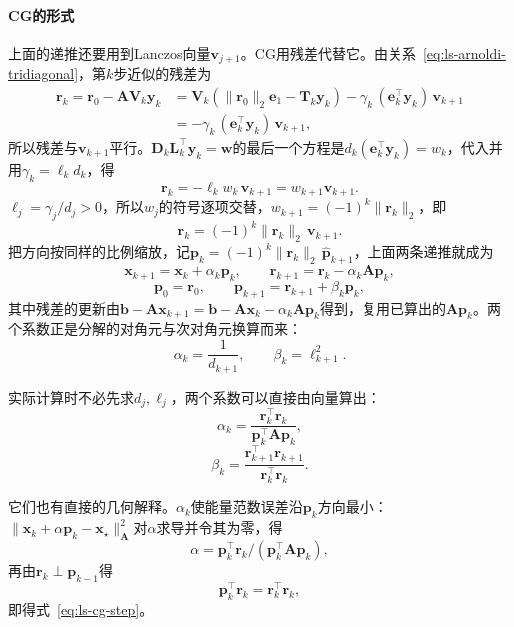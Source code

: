 \paragraph{CG的形式}
上面的递推还要用到Lanczos向量$\bm v_{j+1}$。CG用残差代替它。由关系~\eqref{eq:ls-arnoldi-tridiagonal}，第$k$步近似的残差为
\[
 \begin{aligned}
 \bm r_k=\bm r_0-\bm A\bm V_k\bm y_k
 &=\bm V_k(\lVert\bm r_0\rVert_2\bm e_1-\bm T_k\bm y_k)-\gamma_k\,(\bm e_k^\top\bm y_k)\,\bm v_{k+1}\\
 &=-\gamma_k\,(\bm e_k^\top\bm y_k)\,\bm v_{k+1},
 \end{aligned}
\]
所以残差与$\bm v_{k+1}$平行。$\bm D_k\bm L_k^\top\bm y_k=\bm w$的最后一个方程是$d_k(\bm e_k^\top\bm y_k)=w_k$，代入并用$\gamma_k=\ell_kd_k$，得
\[
 \bm r_k=-\ell_kw_k\,\bm v_{k+1}=w_{k+1}\bm v_{k+1} .
\]
$\ell_j=\gamma_j/d_j>0$，所以$w_j$的符号逐项交替，$w_{k+1}=(-1)^k\lVert\bm r_k\rVert_2$，即
\begin{equation}
 \bm r_k=(-1)^k\lVert\bm r_k\rVert_2\,\bm v_{k+1} .
 \label{eq:ls-cg-residual-lanczos}
\end{equation}
把方向按同样的比例缩放，记$\bm p_k=(-1)^k\lVert\bm r_k\rVert_2\,\hat{\bm p}_{k+1}$，上面两条递推就成为
\begin{equation}
 \bm x_{k+1}=\bm x_k+\alpha_k\bm p_k,\qquad \bm r_{k+1}=\bm r_k-\alpha_k\bm A\bm p_k ,
 \label{eq:ls-cg-update}
\end{equation}
\begin{equation}
 \bm p_0=\bm r_0,\qquad \bm p_{k+1}=\bm r_{k+1}+\beta_k\bm p_k ,
 \label{eq:ls-cg-direction}
\end{equation}
其中残差的更新由$\bm b-\bm A\bm x_{k+1}=\bm b-\bm A\bm x_k-\alpha_k\bm A\bm p_k$得到，复用已算出的$\bm A\bm p_k$。两个系数正是分解的对角元与次对角元换算而来：
\begin{equation}
 \alpha_k=\frac1{d_{k+1}},\qquad \beta_k=\ell_{k+1}^2 .
 \label{eq:ls-cg-coefficients-ldl}
\end{equation}

实际计算时不必先求$d_j,\ell_j$，两个系数可以直接由向量算出：
\begin{equation}
 \alpha_k=\frac{\bm r_k^\top\bm r_k}{\bm p_k^\top\bm A\bm p_k},
 \label{eq:ls-cg-step}
\end{equation}
\begin{equation}
 \beta_k=\frac{\bm r_{k+1}^\top\bm r_{k+1}}{\bm r_k^\top\bm r_k}.
 \label{eq:ls-cg-beta}
\end{equation}

它们也有直接的几何解释。$\alpha_k$使能量范数误差沿$\bm p_k$方向最小：$\lVert\bm x_k+\alpha\bm p_k-\bm x_\star\rVert_{\bm A}^2$对$\alpha$求导并令其为零，得
\[
  \alpha=\bm p_k^\top\bm r_k/(\bm p_k^\top\bm A\bm p_k) ,
\]
再由$\bm r_k\perp\bm p_{k-1}$得
\[
  \bm p_k^\top\bm r_k=\bm r_k^\top\bm r_k ,
\]
即得式~\eqref{eq:ls-cg-step}。

